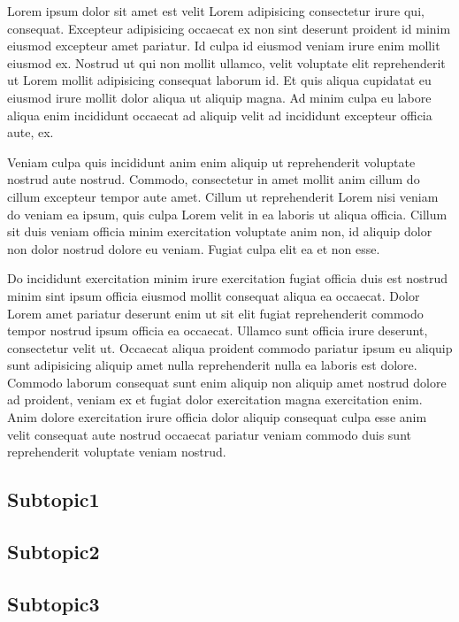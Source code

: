 Lorem ipsum dolor sit amet est velit Lorem adipisicing consectetur irure qui, consequat. Excepteur adipisicing occaecat ex non sint deserunt proident id minim eiusmod excepteur amet pariatur. Id culpa id eiusmod veniam irure enim mollit eiusmod ex. Nostrud ut qui non mollit ullamco, velit voluptate elit reprehenderit ut Lorem mollit adipisicing consequat laborum id. Et quis aliqua cupidatat eu eiusmod irure mollit dolor aliqua ut aliquip magna. Ad minim culpa eu labore aliqua enim incididunt occaecat ad aliquip velit ad incididunt excepteur officia aute, ex.

Veniam culpa quis incididunt anim enim aliquip ut reprehenderit voluptate nostrud aute nostrud. Commodo, consectetur in amet mollit anim cillum do cillum excepteur tempor aute amet. Cillum ut reprehenderit Lorem nisi veniam do veniam ea ipsum, quis culpa Lorem velit in ea laboris ut aliqua officia. Cillum sit duis veniam officia minim exercitation voluptate anim non, id aliquip dolor non dolor nostrud dolore eu veniam. Fugiat culpa elit ea et non esse.

Do incididunt exercitation minim irure exercitation fugiat officia duis est nostrud minim sint ipsum officia eiusmod mollit consequat aliqua ea occaecat. Dolor Lorem amet pariatur deserunt enim ut sit elit fugiat reprehenderit commodo tempor nostrud ipsum officia ea occaecat. Ullamco sunt officia irure deserunt, consectetur velit ut. Occaecat aliqua proident commodo pariatur ipsum eu aliquip sunt adipisicing aliquip amet nulla reprehenderit nulla ea laboris est dolore. Commodo laborum consequat sunt enim aliquip non aliquip amet nostrud dolore ad proident, veniam ex et fugiat dolor exercitation magna exercitation enim. Anim dolore exercitation irure officia dolor aliquip consequat culpa esse anim velit consequat aute nostrud occaecat pariatur veniam commodo duis sunt reprehenderit voluptate veniam nostrud.

\subsection{Subtopic1}


\subsection{Subtopic2}


\subsection{Subtopic3}

